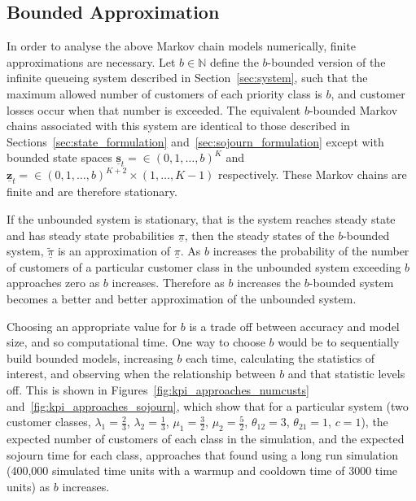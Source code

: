 \documentclass{article}
\begin{document}
\subsection{Bounded Approximation}\label{sec:bound}
In order to analyse the above Markov chain models numerically, finite
approximations are necessary. Let $b \in \mathbb{N}$ define the $b$-bounded
version of the infinite queueing system described in Section~\ref{sec:system},
such that the maximum allowed number of customers of each priority class is $b$,
and customer losses occur when that number is exceeded. The equivalent
$b$-bounded Markov chains associated with this system are identical to those
described in Sections~\ref{sec:state_formulation}
and~\ref{sec:sojourn_formulation} except with bounded state spaces
$\underline{\mathbf{s}}_t = \in (0, 1, \dots, b)^K$ and
$\underline{\mathbf{z}}_t = \in (0, 1, \dots, b)^{K+2} \times (1, \dots, K - 1)$
respectively. These Markov chains are finite and are therefore stationary.

If the unbounded system is stationary, that is the system reaches steady state
and has steady state probabilities $\underline{\pi}$, then the steady states of
the $b$-bounded system, $\underline{\tilde{\pi}}$ is an approximation of
$\underline{\pi}$. As $b$ increases the probability of the number of
customers of a particular customer class in the unbounded system exceeding $b$
approaches zero as $b$ increases. Therefore as $b$ increases the $b$-bounded
system becomes a better and better approximation of the unbounded system.

Choosing an appropriate value for $b$ is a trade off between accuracy and model
size, and so computational time. One way to choose $b$ would be to
sequentially build bounded models, increasing $b$ each time, calculating the
statistics of interest, and observing when the relationship between $b$ and that
statistic levels off. This is shown in Figures~\ref{fig:kpi_approaches_numcusts}
and~\ref{fig:kpi_approaches_sojourn}, which show that for a particular system
(two customer classes, $\lambda_1=\frac{2}{3}$, $\lambda_2=\frac{1}{3}$,
$\mu_1=\frac{3}{2}$, $\mu_2=\frac{5}{2}$, $\theta_{12}=3$, $\theta_{21}=1$,
$c=1$), the expected number of customers of each class in the simulation, and
the expected sojourn time for each class, approaches that found using a long run
simulation (400,000 simulated time units with a warmup and cooldown time of 3000
time units) as $b$ increases.
\end{document}
